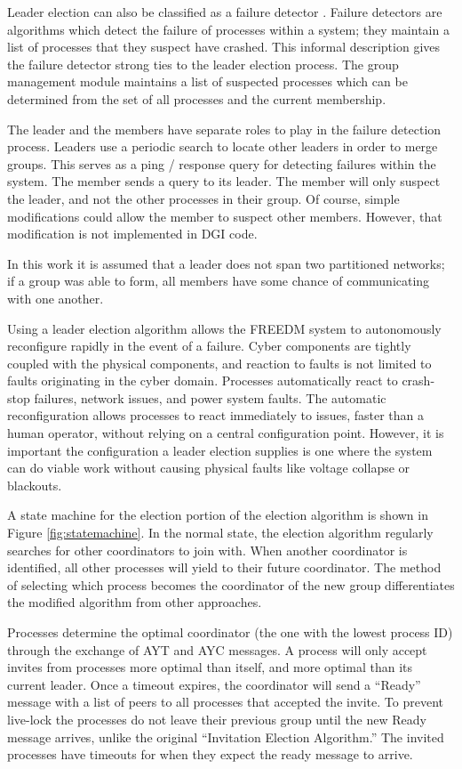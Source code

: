 Leader election can also be classified as a failure detector \cite{LEADERELECTIONEVAL}.
Failure detectors are algorithms which detect the failure of processes within a system; they maintain a list of processes that they suspect have crashed.
This informal description gives the failure detector strong ties to the leader election process. 
The group management module maintains a list of suspected processes which can be determined from the set of all processes and the current membership.

The leader and the members have separate roles to play in the failure detection process.
Leaders use a periodic search to locate other leaders in order to merge groups.
This serves as a ping / response query for detecting failures within the system.
The member sends a query to its leader.
The member will only suspect the leader, and not the other processes in their group.
Of course, simple modifications could allow the member to suspect other members.
However, that modification is not implemented in DGI code.

In this work it is assumed that a leader does not span two partitioned networks; if a group was able to form, all members have some chance of communicating with one another.

Using a leader election algorithm allows the \ac{FREEDM} system to autonomously reconfigure rapidly in the event of a failure.
Cyber components are tightly coupled with the physical components, and reaction to faults is not limited to faults originating in the cyber domain.
Processes automatically react to crash-stop failures, network issues, and power system faults.
The automatic reconfiguration allows processes to react immediately to issues, faster than a human operator, without relying on a central configuration point.
However, it is important the configuration a leader election supplies is one where the system can do viable work without causing physical faults like voltage collapse or blackouts\cite{HARINI}.

A state machine for the election portion of the election algorithm is shown in Figure \ref{fig:statemachine}.
In the normal state, the election algorithm regularly searches for other coordinators to join with.
When another coordinator is identified, all other processes will yield to their future coordinator.
The method of selecting which process becomes the coordinator of the new group differentiates the modified algorithm from other approaches.

Processes determine the optimal coordinator (the one with the lowest process ID) through the exchange of \ac{AYT} and \ac{AYC} messages.
A process will only accept invites from processes more optimal than itself, and more optimal than its current leader.
Once a timeout expires, the coordinator will send a ``Ready'' message with a list of peers to all processes that accepted the invite.
To prevent live-lock the processes do not leave their previous group until the new Ready message arrives, unlike the original ``Invitation Election Algorithm.''
The invited processes have timeouts for when they expect the ready message to arrive.

